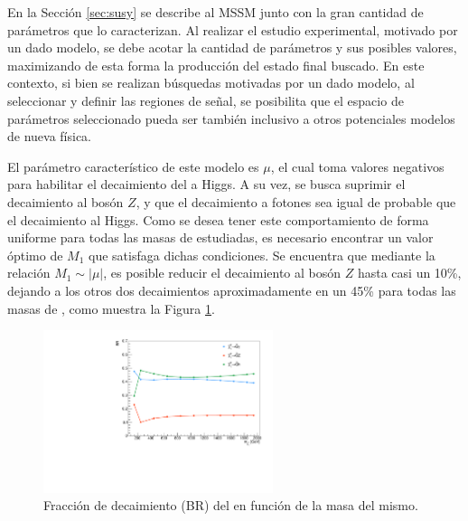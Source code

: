 En la Sección \ref{sec:susy} se describe al MSSM junto con la gran cantidad de parámetros que lo caracterizan. 
Al realizar el estudio experimental, motivado por un dado modelo, se debe acotar la cantidad de parámetros y sus posibles valores, maximizando de esta forma la producción del estado final buscado. En este contexto, si bien se realizan búsquedas motivadas por un dado modelo, al seleccionar y definir las regiones de señal, se posibilita que el espacio de parámetros seleccionado pueda ser también inclusivo a otros potenciales modelos de nueva física. 

El parámetro característico de este modelo es $\mu$, el cual toma valores negativos para habilitar el decaimiento del \ninoone a Higgs. A su vez, se busca suprimir el decaimiento al bosón $Z$, y que el decaimiento a fotones sea igual de probable que el decaimiento al Higgs. Como se desea tener este comportamiento de forma uniforme para todas las masas de \ninoone estudiadas, es necesario encontrar un valor óptimo de $M_1$ que satisfaga dichas condiciones. Se encuentra que mediante la relación $M_1 \sim |\mu|$,
es posible reducir el decaimiento al bosón $Z$ hasta casi un 10\%, dejando a los otros dos decaimientos aproximadamente en un 45\% para todas las masas de \ninoone, como muestra la Figura \ref{fig:n1_br}. 

\begin{figure}
  \centering
  \includegraphics[width=0.6\textwidth]{images/analysis/phb_n1_br.pdf}
  \caption{Fracción de decaimiento (BR) del \ninoone en función de la masa del mismo.}
  \label{fig:n1_br}
\end{figure}

